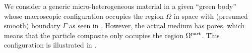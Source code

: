 \documentclass[MikaelDissertation.tex]{subfiles}
\begin{document}
We consider a generic micro-heterogeneous material in a given ``green body'' whose macroscopic configuration occupies the region $\Omega$ in space with (presumed smooth) boundary $\Gamma$ as seen in .
However, the actual medium has pores, which means that the particle composite only occupies the region $\Omega^{\mathrm{part}}$.
This configuration is illustrated in .
\end{document}

